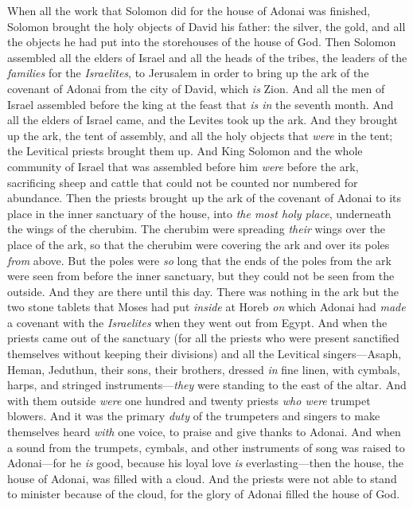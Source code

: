 \begin{biblechapter} %
 When all the work that Solomon did for the house of Adonai was finished, Solomon brought the holy objects of David his father: the silver, the gold, and all the objects he had put into the storehouses of the house of God.
\verse Then Solomon assembled all the elders of Israel and all the heads of the tribes, the leaders of the \textit{families} for the \textit{Israelites}, to Jerusalem in order to bring up the ark of the covenant of Adonai from the city of David, which \textit{is} Zion.
\verse And all the men of Israel assembled before the king at the feast that \textit{is in} the seventh month.
\verse And all the elders of Israel came, and the Levites took up the ark.
\verse And they brought up the ark, the tent of assembly, and all the holy objects that \textit{were} in the tent; the Levitical priests brought them up.
\verse And King Solomon and the whole community of Israel that was assembled before him \textit{were} before the ark, sacrificing sheep and cattle that could not be counted nor numbered for abundance.
\verse Then the priests brought up the ark of the covenant of Adonai to its place in the inner sanctuary of the house, into \textit{the most holy place}, underneath the wings of the cherubim.
\verse The cherubim were spreading \textit{their} wings over the place of the ark, so that the cherubim were covering the ark and over its poles \textit{from} above.
\verse But the poles were \textit{so} long that the ends of the poles from the ark were seen from before the inner sanctuary, but they could not be seen from the outside. And they are there until this day.
\verse There was nothing in the ark but the two stone tablets that Moses had put \textit{inside} at Horeb \textit{on} which Adonai had \textit{made} a covenant with the \textit{Israelites} when they went out from Egypt.
\verse And when the priests came out of the sanctuary (for all the priests who were present sanctified themselves without keeping their divisions)
\verse and all the Levitical singers—Asaph, Heman, Jeduthun, their sons, their brothers, dressed \textit{in} fine linen, with cymbals, harps, and stringed instruments—\textit{they} were standing to the east of the altar. And with them outside \textit{were} one hundred and twenty priests \textit{who were} trumpet blowers.
\verse And it was the primary \textit{duty} of the trumpeters and singers to make themselves heard \textit{with} one voice, to praise and give thanks to Adonai. And when a sound from the trumpets, cymbals, and other instruments of song was raised to Adonai—for he \textit{is} good, because his loyal love \textit{is} everlasting—then the house, the house of Adonai, was filled with a cloud.
\verse And the priests were not able to stand to minister because of the cloud, for the glory of Adonai filled the house of God.
\end{biblechapter}

